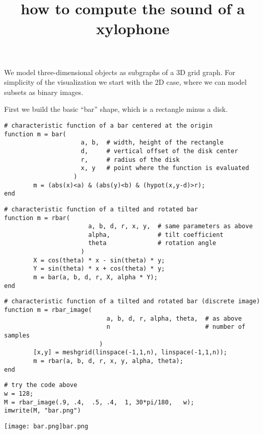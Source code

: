 \title{how to compute the sound of a xylophone}

%

We model three-dimensional objects as subgraphs of a 3D grid graph.
For simplicity of the visualization we start with the 2D case, where we can
model subsets as binary images.


First we build the basic ``bar'' shape, which is a rectangle minus a disk.

\begin{verbatim}
# characteristic function of a bar centered at the origin
function m = bar(
                     a, b,  # width, height of the rectangle
                     d,     # vertical offset of the disk center
                     r,     # radius of the disk
                     x, y   # point where the function is evaluated
                   )
        m = (abs(x)<a) & (abs(y)<b) & (hypot(x,y-d)>r);
end
\end{verbatim}

\begin{verbatim}
# characteristic function of a tilted and rotated bar
function m = rbar(
                       a, b, d, r, x, y,  # same parameters as above
                       alpha,             # tilt coefficient
                       theta              # rotation angle
                     )
        X = cos(theta) * x - sin(theta) * y;
        Y = sin(theta) * x + cos(theta) * y;
        m = bar(a, b, d, r, X, alpha * Y);
end
\end{verbatim}

\begin{verbatim}
# characteristic function of a tilted and rotated bar (discrete image)
function m = rbar_image(
                            a, b, d, r, alpha, theta,  # as above
                            n                          # number of samples
                          )
        [x,y] = meshgrid(linspace(-1,1,n), linspace(-1,1,n));
        m = rbar(a, b, d, r, x, y, alpha, theta);
end
\end{verbatim}

\begin{verbatim}
# try the code above
w = 128;
M = rbar_image(.9, .4,  .5, .4,  1, 30*pi/180,   w);
imwrite(M, "bar.png")
\end{verbatim}

\texttt{[image: bar.png]}\verb+bar.png+

